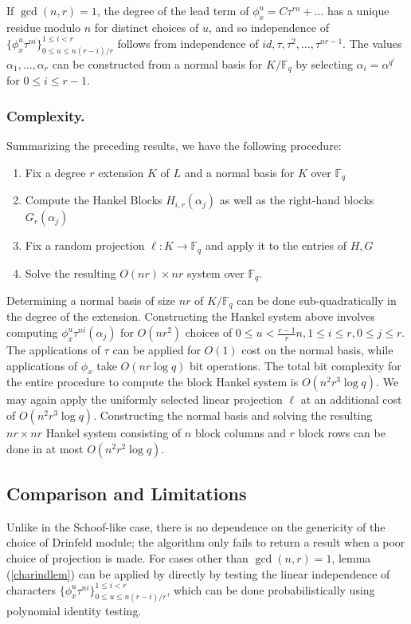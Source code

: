 \documentclass[sigconf]{acmart}
\newcommand{\F}{\mathbb{F}}
\begin{document}
If $\gcd(n,r) = 1$, the degree of the lead term of $\phi_x^u = C\tau^{ru} + \ldots$ has a unique residue modulo $n$ for distinct choices of $u$, and so independence of $\{ \phi_x^{u}\tau^{ni} \}_{0 \leq u \leq n(r-i)/r }^{1 \leq i < r}$ follows from independence of $id, \tau, \tau^2, \ldots, \tau^{nr-1}$. The values $\alpha_1, \ldots, \alpha_r$ can be constructed from a normal basis for $K/\F_q$ by selecting $\alpha_i = \alpha^{q^i}$ for $0 \leq i \leq r - 1$.

\subsubsection{Complexity.} Summarizing the preceding results, we have the following procedure:

\begin{enumerate}
    \item Fix a degree $r$ extension $K$ of $L$ and a normal basis for $K$ over $\F_q$
    \item Compute the Hankel Blocks $H_{i,r}(\alpha_j)$ as well as the right-hand blocks $G_r(\alpha_j)$
    \item Fix a random projection $\ell: K \to \F_q$ and apply it to the entries of $H, G$
    \item Solve the resulting $O(nr) \times nr$ system over $\F_q$.
\end{enumerate}
Determining a normal basis of size $nr$ of $K/\F_q$ can be done sub-quadratically in the degree of the extension. Constructing the Hankel system above involves computing $\phi_x^{u}\tau^{ni}(\alpha_j)$ for $O(nr^2)$ choices of $0 \leq u < \frac{r-1}{r}n, 1 \leq i \leq r, 0 \leq j \leq r$. The applications of $\tau$ can be applied for $O(1)$ cost on the normal basis, while applications of $\phi_x$ take $O(nr \log q)$ bit operations. The total bit complexity for the entire procedure to compute the block Hankel system is $O(n^2r^3\log q)$. We may again apply the uniformly selected linear projection $\ell$ at an additional cost of $O(n^2r^3\log q)$. Constructing the normal basis and solving the resulting $nr \times nr$ Hankel system consisting of $n$ block columns and $r$ block rows can be done in at most $O(n^2r^2\log q)$.

\subsection{Comparison and Limitations}

Unlike in the Schoof-like case, there is no dependence on the genericity of the choice of Drinfeld module; the algorithm only fails to return a result when a poor choice of projection is made. For cases other than $\gcd(n,r) = 1$, lemma (\ref{charindlem}) can be applied by directly by testing the linear independence of characters $\{ \phi_x^{u}\tau^{ni} \}_{0 \leq u \leq n(r-i)/r }^{1 \leq i < r}$, which can be done probabilistically using polynomial identity testing. 














\end{document}
